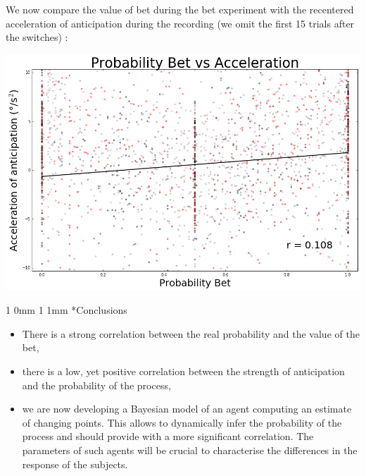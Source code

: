 \documentclass[profile,final,english, draft]{sciposter}%
\makeatletter
\renewcommand{\section}{\@startsection
        {section}%
        {1}%
        {0mm}%
        {1\baselineskip}%
        {1mm}%
        {\LARGE\color{red}\bfseries}}%
\makeatother
\begin{document}
\begin{multicols}{3}
We now compare the value of bet during the bet experiment with the recentered acceleration of anticipation during the recording (we omit the first 15 trials after the switches) :



\begin{center} 
    \includegraphics[width=1\columnwidth]{p_parie--v_a_15_mean}
\end{center}

\section*{Conclusions}


\begin{itemize}\setlength{\itemsep}{0ex}
\item There is a strong correlation between the real probability and the value of the bet,

\item there is a low, yet positive correlation between the strength of anticipation and the probability of the process,

\item we are now developing a Bayesian model of an agent computing an estimate of changing points. This allows to dynamically infer the probability of the process and should provide with a more significant correlation. The parameters of such agents will be crucial to characterise the differences in the response of the subjects.

\end{itemize}

{\small
\printbibliography
}


\end{multicols}


\end{document}
